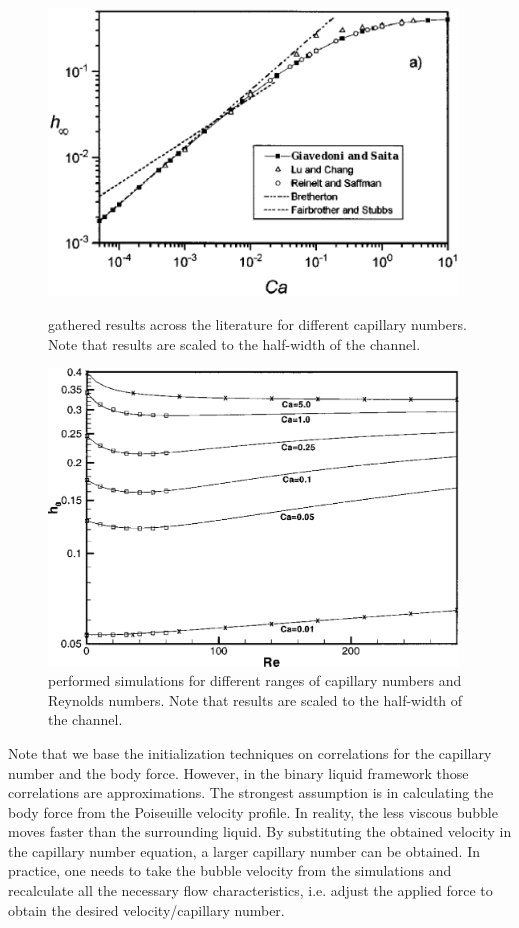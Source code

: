 \documentclass[preprint,12pt]{elsarticle}
\begin{document}
\begin{figure}
\includegraphics[width=0.97\textwidth]{Figures/giavedoni_planar.eps}
\caption{\citet{giavedoni-numerical} gathered results across the
literature for different capillary numbers. Note that results are scaled to the half-width of the
channel. \label{fig:giavedoni:planar}}
\includegraphics[width=0.97\textwidth]{Figures/heil-planar.eps}
\caption{\citet{heil-bretherton} performed simulations for different ranges of
capillary numbers and Reynolds numbers. Note that results are scaled to the half-width of the channel.
\label{fig:heil:planar}}
\end{figure}
Note that we base the initialization techniques on correlations for the
capillary number and the body force. However, in the binary liquid framework
those correlations are approximations. The strongest assumption is
in calculating the body force from the Poiseuille velocity profile.
In reality, the less viscous bubble moves faster than the surrounding liquid. By
substituting the obtained velocity in the capillary number equation, a
larger capillary number can be obtained. In practice, one needs to take the bubble velocity from the
simulations and
recalculate all the necessary flow characteristics, i.e. adjust the
 applied force to obtain the desired velocity/capillary number.
\end{document}
